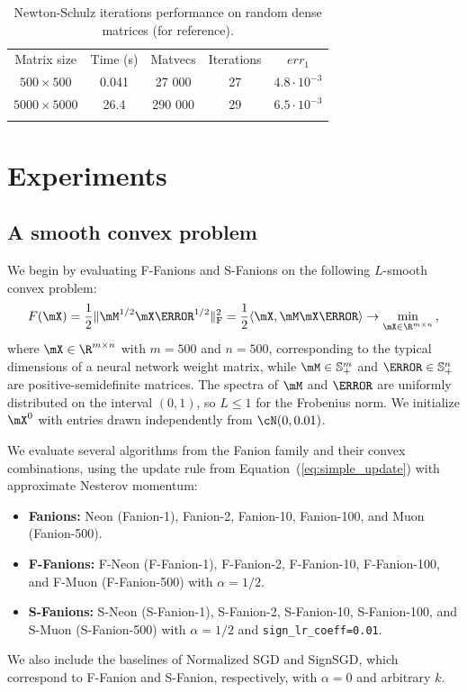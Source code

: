 \documentclass[smallextended,referee,envcountsect]{svjour3}
\DeclarePairedDelimiter{\normf}{\|}{\|_\mathrm{F}}
\def\<#1,#2>{\langle #1,#2\rangle}
\newcommand{\Rmn}{\R^{m\times n}}
\newcommand{\equationref}[1]{Equation~(\ref{#1})}
\begin{document}
 \begin{table}[ht]
 
\caption{Newton-Schulz iterations performance on random dense matrices (for reference).}\label{tbl:newton_schulz_reference}
%
     \begin{tabular}{ccccc}
       \arrayrulecolor{black}\toprule
       Matrix size    & Time (s) & Matvecs & Iterations & $err_1$ \\
       \arrayrulecolor{black}\hline
       $500 \times 500$     & 0.041    & 27 000  & 27         & $4.8 \cdot 10^{-3}$  \\
       $5000 \times 5000$   & 26.4     & 290 000 & 29         & $6.5 \cdot 10^{-3}$  \\
       \arrayrulecolor{black}\bottomrule
     \end{tabular}%
   

 \end{table}
 
 \section{Experiments}\label{sec:experiments}
 
 \subsection{A smooth convex problem}
 \label{subsec:lls_exps}
 
 We begin by evaluating F-Fanions and S-Fanions on the following $L$-smooth convex problem:
 \begin{equation}\label{eq:lls}
   F(\mX) = \frac{1}{2}\normf{\mM^{1/2}\mX\mN^{1/2}}^2 = \frac{1}{2} \<\mX, \mM \mX \mN> \to \min_{\mX \in \Rmn}\,,
 \end{equation}
 where $\mX \in \Rmn$ with $m=500$ and $n=500$, corresponding to the typical dimensions of a neural network weight matrix, while $\mM \in \mathbb{S}^m_{+}$ and $\mN \in \mathbb{S}^n_{+}$ are positive-semidefinite matrices. The spectra of $\mM$ and $\mN$ are uniformly distributed on the interval $(0, 1)$, so $L \le 1$ for the Frobenius norm. We initialize $\mX^0$ with entries drawn independently from $\cN(0, 0.01)$.
 
 We evaluate several algorithms from the Fanion family and their convex combinations, using the update rule from \equationref{eq:simple_update} with approximate Nesterov momentum:
 \begin{itemize}
   \item \textbf{Fanions:} Neon (Fanion-1), Fanion-2, Fanion-10, Fanion-100, and Muon (Fanion-500).
   \item \textbf{F-Fanions:} F-Neon (F-Fanion-1), F-Fanion-2, F-Fanion-10, F-Fanion-100, and F-Muon (F-Fanion-500) with $\alpha=1/2$.
   \item \textbf{S-Fanions:} S-Neon (S-Fanion-1), S-Fanion-2, S-Fanion-10, S-Fanion-100, and S-Muon (S-Fanion-500) with $\alpha=1/2$ and \texttt{sign\_lr\_coeff=0.01}.
 \end{itemize}
 We also include the baselines of Normalized SGD and SignSGD, which correspond to F-Fanion and S-Fanion, respectively, with $\alpha = 0$ and arbitrary $k$.
 
\end{document}
